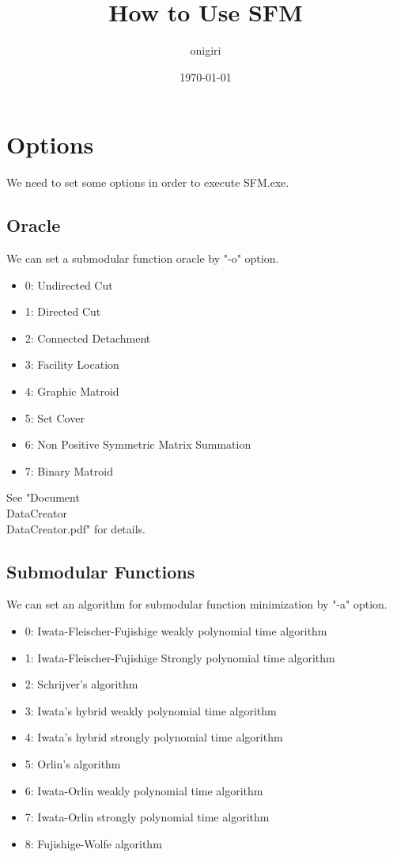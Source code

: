 \documentclass{article}
\begin{document}
\fontsize{10pt}{12pt}\selectfont
%

\title{How to Use SFM }
\author{onigiri}
\date{\today}


\maketitle
\newpage


\tableofcontents

\newpage

\section{Options}
We need to set some options in order to execute SFM.exe.

\subsection{Oracle}
We can set a submodular function oracle by "-o" option.
\begin{itemize}
\item 0: Undirected Cut
\item 1: Directed Cut
\item 2: Connected Detachment
\item 3: Facility Location
\item 4: Graphic Matroid
\item 5: Set Cover
\item 6: Non Positive Symmetric Matrix Summation
\item 7: Binary Matroid
\end{itemize}

See "Document\\DataCreator\\DataCreator.pdf" for details.

\subsection{Submodular Functions}
We can set an algorithm for submodular function minimization by "-a" option.
\begin{itemize}
\item 0: Iwata-Fleischer-Fujishige weakly polynomial time algorithm
\item 1: Iwata-Fleischer-Fujishige Strongly polynomial time algorithm
\item 2: Schrijver's algorithm
\item 3: Iwata's hybrid weakly polynomial time algorithm
\item 4: Iwata's hybrid strongly polynomial time algorithm
\item 5: Orlin's algorithm
\item 6: Iwata-Orlin weakly polynomial time algorithm
\item 7: Iwata-Orlin strongly polynomial time algorithm
\item 8: Fujishige-Wolfe algorithm
\end{itemize}
\end{document}
